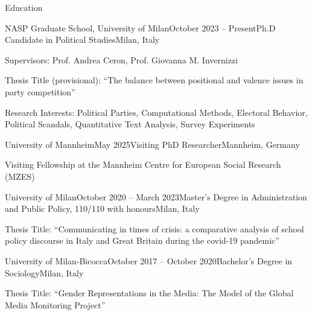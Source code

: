 \documentclass{cv} %
\begin{document}

\begin{rSection}{Education}

\begin{rSubsection}{NASP Graduate School, University of Milan}{October 2023 -- Present}{Ph.D Candidate in Political Studies}{Milan, Italy}
\item Supervisors: Prof. Andrea Ceron, Prof. Giovanna M. Invernizzi
\item Thesis Title (provisional): “The balance between positional and valence issues in party competition”
\item Research Interests: Political Parties, Computational Methods, Electoral Behavior, Political Scandals, Quantitative Text Analysis, Survey Experiments
\end{rSubsection}

\begin{rSubsection}{University of Mannheim}{May 2025}{Visiting PhD Researcher}{Mannheim, Germany}
\item Visiting Fellowship at the Mannheim Centre for European Social Research (MZES)
\end{rSubsection}

\begin{rSubsection}{University of Milan}{October 2020 -- March 2023}{Master's Degree in Administration and Public Policy, 110/110 with honours}{Milan, Italy}
\item Thesis Title: “Communicating in times of crisis: a comparative analysis of school policy discourse in Italy and Great Britain during the covid-19 pandemic”
\end{rSubsection}

\begin{rSubsection}{University of Milan-Bicocca}{October 2017 -- October 2020}{Bachelor's Degree in Sociology}{Milan, Italy}
\item Thesis Title: “Gender Representations in the Media: The Model of the Global Media Monitoring Project”
\end{rSubsection}

\end{rSection}
\end{document}
